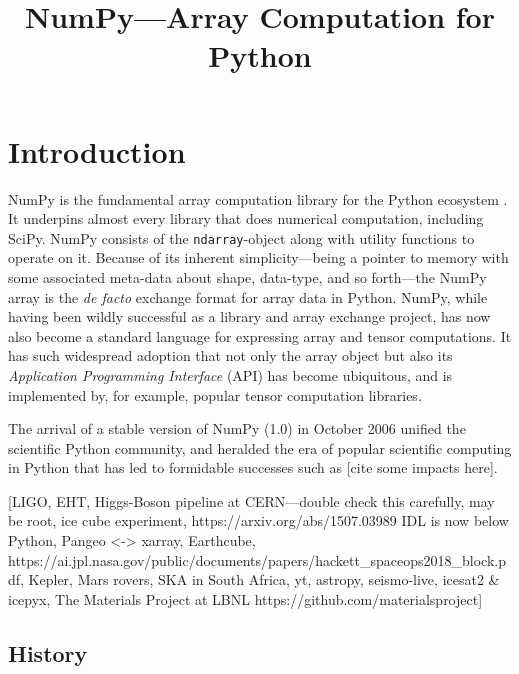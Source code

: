 \documentclass[fleqn,10pt]{wlscirep}
\title{NumPy---Array Computation for Python}
\newcommand{\code}[1]{\texttt{#1}}
\begin{document}
\flushbottom
\maketitle
\thispagestyle{empty}



\section*{Introduction}

NumPy is the fundamental array computation library for the Python
ecosystem \cite{dubois2007guest,oliphant2007python,millman2011python,perez2011python}.
It underpins almost every library that does numerical
computation, including SciPy.  NumPy consists of the \code{ndarray}-object
along with utility functions to operate on it.  Because of
its inherent simplicity—being a pointer to memory with some
associated meta-data about shape, data-type, and so forth—the NumPy
array is the {\it de facto} exchange format for array data in
Python.
NumPy, while having been wildly successful as a library and array exchange
project, has now also become a standard language for expressing array and
tensor computations.  
It has such widespread adoption that not only the array object but also its
{\it Application Programming Interface} (API) has become ubiquitous, and is
implemented by, for example, popular tensor computation libraries.

The arrival of a stable version of NumPy (1.0) in October 2006 unified
the scientific Python community, and heralded the era of popular
scientific computing in Python that has led to formidable successes
such as [cite some impacts here].

[LIGO, EHT, Higgs-Boson pipeline at CERN—double check this carefully,
  may be root, ice cube experiment, https://arxiv.org/abs/1507.03989
  IDL is now below Python, Pangeo <-> xarray, Earthcube,
  https://ai.jpl.nasa.gov/public/documents/papers/hackett\_spaceops2018\_block.pdf,
  Kepler, Mars rovers, SKA in South Africa, yt, astropy, seismo-live,
  icesat2 \& icepyx, The Materials Project at LBNL https://github.com/materialsproject]

\subsection*{History}
\end{document}
